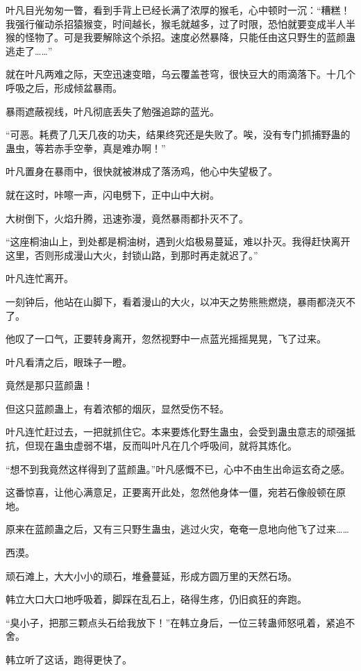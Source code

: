 \begin{this_body}
叶凡目光匆匆一瞥，看到手背上已经长满了浓厚的猴毛，心中顿时一沉：“糟糕！我强行催动杀招猿猴变，时间越长，猴毛就越多，过了时限，恐怕就要变成半人半猴的怪物了。可是我要解除这个杀招。速度必然暴降，只能任由这只野生的蓝颜蛊逃走了……”

就在叶凡两难之际，天空迅速变暗，乌云覆盖苍穹，很快豆大的雨滴落下。十几个呼吸之后，形成倾盆暴雨。

暴雨遮蔽视线，叶凡彻底丢失了勉强追踪的蓝光。

“可恶。耗费了几天几夜的功夫，结果终究还是失败了。唉，没有专门抓捕野蛊的蛊虫，等若赤手空拳，真是难办啊！”

叶凡置身在暴雨中，很快就被淋成了落汤鸡，他心中失望极了。

就在这时，咔嚓一声，闪电劈下，正中山中大树。

大树倒下，火焰升腾，迅速弥漫，竟然暴雨都扑灭不了。

“这座桐油山上，到处都是桐油树，遇到火焰极易蔓延，难以扑灭。我得赶快离开这里，否则形成漫山大火，封锁山路，到那时再走就迟了。”

叶凡连忙离开。

一刻钟后，他站在山脚下，看着漫山的大火，以冲天之势熊熊燃烧，暴雨都浇灭不了。

他叹了一口气，正要转身离开，忽然视野中一点蓝光摇摇晃晃，飞了过来。

叶凡看清之后，眼珠子一瞪。

竟然是那只蓝颜蛊！

但这只蓝颜蛊上，有着浓郁的烟灰，显然受伤不轻。

叶凡连忙赶过去，一把就抓住它。本来要炼化野生蛊虫，会受到蛊虫意志的顽强抵抗，但现在蛊虫虚弱不堪，反而叫叶凡在几个呼吸间，就将其炼化。

“想不到我竟然这样得到了蓝颜蛊。”叶凡感慨不已，心中不由生出命运玄奇之感。

这番惊喜，让他心满意足，正要离开此处，忽然他身体一僵，宛若石像般顿在原地。

原来在蓝颜蛊之后，又有三只野生蛊虫，逃过火灾，奄奄一息地向他飞了过来……

西漠。

顽石滩上，大大小小的顽石，堆叠蔓延，形成方圆万里的天然石场。

韩立大口大口地呼吸着，脚踩在乱石上，硌得生疼，仍旧疯狂的奔跑。

“臭小子，把那三颗点头石给我放下！”在韩立身后，一位三转蛊师怒吼着，紧追不舍。

韩立听了这话，跑得更快了。


\end{this_body}
